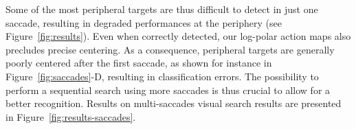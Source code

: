 Some of the most peripheral targets are thus difficult to detect in just one saccade, resulting in degraded performances at the periphery (see Figure~\ref{fig:results}). Even when correctly detected, our log-polar action maps also precludes precise centering. As a consequence, peripheral targets are generally poorly centered after the first saccade, as shown for instance in Figure~\ref{fig:saccades}-D, resulting in classification errors. The possibility to perform a sequential search using more saccades is thus crucial to allow for a better recognition. Results on multi-saccades visual search results are presented in Figure~\ref{fig:results-saccades}.
\begin{figure}[t!]%

\end{figure}
